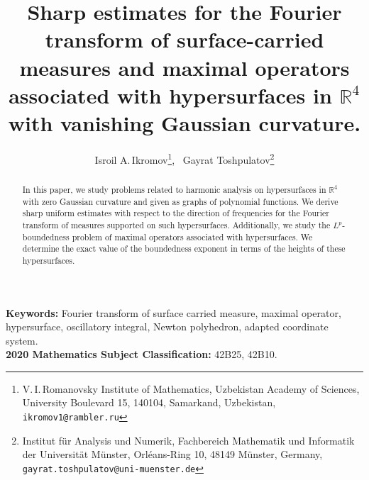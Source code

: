 \documentclass[a4paper, 11pt]{article}
\theoremstyle{plain}
\theoremstyle{definition}
\theoremstyle{lemma}
\theoremstyle{Remark}
\theoremstyle{proposition}
\theoremstyle{corollary}
\theoremstyle{example}
\theoremstyle{assumption}
\begin{document}
\pagestyle{empty}
\title{Sharp estimates for the Fourier transform of surface-carried measures and maximal operators associated with  hypersurfaces in $\mathbb{R}^4$ with vanishing Gaussian curvature.}



\author{Isroil A.\,Ikromov\thanks{V.\,I.\,Romanovsky Institute  of Mathematics,  Uzbekistan Academy of Sciences,
University Boulevard 15, 140104, Samarkand,  Uzbekistan,
{\tt ikromov1@rambler.ru}},    \,\,\,Gayrat Toshpulatov\thanks{Institut f\"ur Analysis und Numerik, Fachbereich Mathematik und Informatik der Universit\"at M\"unster, Orl\'eans-Ring 10, 48149 M\"unster, Germany, {\tt  gayrat.toshpulatov@uni-muenster.de}}}

\maketitle

\pagestyle{plain}

\begin{abstract}
In this paper, we study problems related to harmonic analysis on hypersurfaces in $\mathbb{R}^4 $ with zero Gaussian curvature and given as  graphs of polynomial functions.  We derive  sharp uniform estimates with respect to the direction of frequencies for the Fourier transform  of measures supported on such hypersurfaces.  Additionally, we study the $L^p$-boundedness problem of maximal operators associated with hypersurfaces. We determine the exact value of  the  boundedness exponent  in terms of the heights of these hypersurfaces.


\end{abstract}
\textbf{Keywords:} Fourier transform
of surface carried measure, maximal operator, hypersurface, oscillatory integral,  Newton polyhedron, adapted coordinate system. %
\\
\textbf{2020
Mathematics Subject Classification:}  42B25, 42B10. %
\tableofcontents
\end{document}
